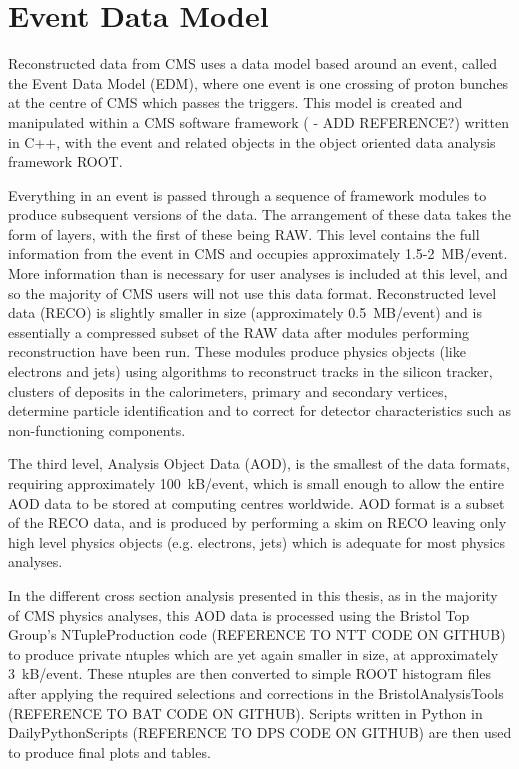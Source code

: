 \section{Event Data Model}
\label{s:Event_Data_Model}
Reconstructed data from CMS uses a data model based around an event, called the Event Data Model (EDM), where
one event is one crossing of proton bunches at the centre of CMS which passes the triggers. This model
is created and manipulated within a CMS software framework ( - ADD REFERENCE?) written in C++, with the event
and related objects in the object oriented data analysis framework ROOT.

Everything in an event is passed through a sequence of framework modules to produce subsequent versions of the
data. The arrangement of these data takes the form of layers, with the first of these being RAW. This level
contains the full information from the event in CMS and occupies approximately 1.5-2~MB/event. More
information than is necessary for user analyses is included at this level, and so the majority of CMS users
will not use this data format. Reconstructed level data (RECO) is slightly smaller in size (approximately
0.5~MB/event) and is essentially a compressed subset of the RAW data after modules performing
reconstruction have been run. These modules produce physics objects (like electrons and jets) using algorithms
to reconstruct tracks in the silicon tracker, clusters of deposits in the calorimeters, primary and secondary
vertices, determine particle identification and to correct for detector characteristics such as
non-functioning components.

The third level, Analysis Object Data (AOD), is the smallest of the data formats, requiring approximately
100~kB/event, which is small enough to allow the entire AOD data to be stored at computing centres worldwide.
AOD format is a subset of the RECO data, and is produced by performing a skim on RECO leaving only high level
physics objects (e.g. electrons, jets) which is adequate for most physics analyses. 

In the different cross section analysis presented in this thesis, as in the majority of CMS physics analyses,
this AOD data is processed using the Bristol Top Group's NTupleProduction code (REFERENCE TO NTT CODE ON
GITHUB) to produce private ntuples which are yet again smaller in size, at approximately 3~kB/event. These
ntuples are then converted to simple ROOT histogram files after applying the required selections and
corrections in the BristolAnalysisTools (REFERENCE TO BAT CODE ON GITHUB). Scripts written in Python in
DailyPythonScripts (REFERENCE TO DPS CODE ON GITHUB) are then used to produce final plots and tables.

